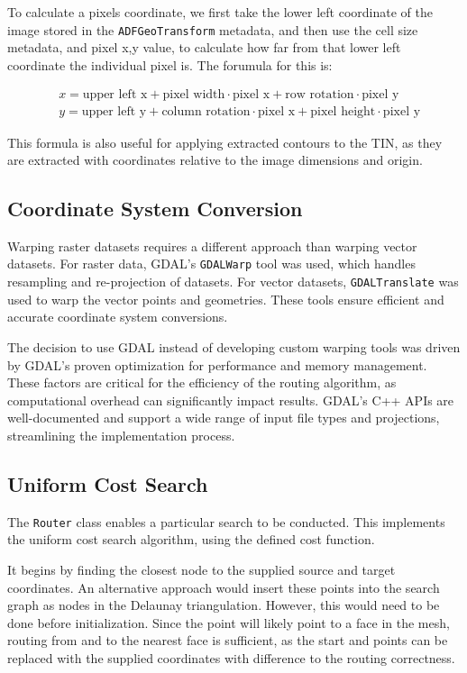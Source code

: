 \documentclass[12pt]{article}
\begin{document}


To calculate a pixels coordinate, we first take the lower left coordinate of the image stored in the \texttt{ADFGeoTransform} metadata, and then use the cell size metadata, and pixel x,y value, to calculate how far from that lower left coordinate the individual pixel is. The forumula for this is:

\begin{align}
   & x = \text{upper left x} + \text{pixel width} \cdot \text{pixel x} + \text{row rotation} \cdot \text{pixel y}     \\
   & y = \text{upper left y} + \text{column rotation} \cdot \text{pixel x} + \text{pixel height} \cdot \text{pixel y}
\end{align}

This formula is also useful for applying extracted contours to the TIN, as they are extracted with coordinates relative to the image dimensions and origin.

\subsection{Coordinate System Conversion}

Warping raster datasets requires a different approach than warping vector datasets. For raster data, GDAL's \texttt{GDALWarp} tool was used, which handles resampling and re-projection of datasets. For vector datasets, \texttt{GDALTranslate} was used to warp the vector points and geometries. These tools ensure efficient and accurate coordinate system conversions.

The decision to use GDAL instead of developing custom warping tools was driven by GDAL's proven optimization for performance and memory management. These factors are critical for the efficiency of the routing algorithm, as computational overhead can significantly impact results. GDAL's C++ APIs are well-documented and support a wide range of input file types and projections, streamlining the implementation process.

\subsection{Uniform Cost Search}

The \texttt{Router} class enables a particular search to be conducted. This implements the uniform cost search algorithm, using the defined cost function.

It begins by finding the closest node to the supplied source and target coordinates. An alternative approach would insert these points into the search graph as nodes in the Delaunay triangulation. However, this would need to be done before initialization. Since the point will likely point to a face in the mesh, routing from and to the nearest face is sufficient, as the start and points can be replaced with the supplied coordinates with difference to the routing correctness.
\end{document}
